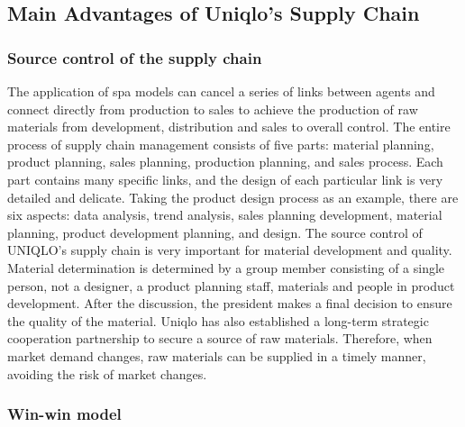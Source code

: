 \documentclass[12pt,a4paper]{article}
\begin{document}
\hypertarget{main-advantages-of-uniqlos-supply-chain}{%
\subsection{Main Advantages of Uniqlo's Supply
Chain}\label{main-advantages-of-uniqlos-supply-chain}}

\hypertarget{source-control-of-the-supply-chain}{%
\subsubsection{Source control of the supply
chain}\label{source-control-of-the-supply-chain}}

The application of spa models can cancel a series of links between
agents and connect directly from production to sales to achieve the
production of raw materials from development, distribution and sales to
overall control. The entire process of supply chain management consists
of five parts: material planning, product planning, sales planning,
production planning, and sales process. Each part contains many specific
links, and the design of each particular link is very detailed and
delicate. Taking the product design process as an example, there are six
aspects: data analysis, trend analysis, sales planning development,
material planning, product development planning, and design. The source
control of UNIQLO's supply chain is very important for material
development and quality. Material determination is determined by a group
member consisting of a single person, not a designer, a product planning
staff, materials and people in product development. After the
discussion, the president makes a final decision to ensure the quality
of the material. Uniqlo has also established a long-term strategic
cooperation partnership to secure a source of raw materials. Therefore,
when market demand changes, raw materials can be supplied in a timely
manner, avoiding the risk of market changes.

\hypertarget{win-win-model}{%
\subsubsection{Win-win model}\label{win-win-model}}
\end{document}
